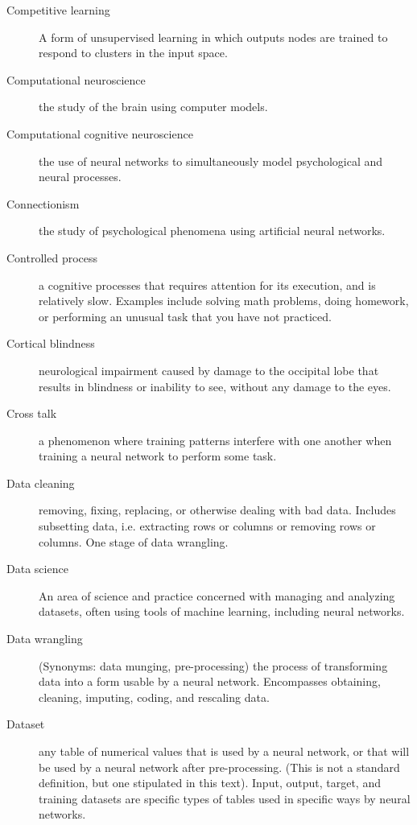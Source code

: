 \begin{description}
\item[Competitive learning] A form of unsupervised learning in which outputs nodes are trained to respond to clusters in the input space. 

\item[Computational neuroscience] the study of the brain using computer models.

\item[Computational cognitive neuroscience] the use of neural networks to simultaneously model psychological and neural processes.

\item[Connectionism] the study of psychological phenomena using artificial neural networks.

\item[Controlled process] a cognitive processes that requires attention for its execution, and is relatively slow. Examples include solving math problems, doing homework, or performing an  unusual task that you have not practiced.

\item[Cortical blindness] neurological impairment caused by damage to the occipital lobe that results in blindness or inability to see, without any damage to the eyes. 

\item[Cross talk] a phenomenon where training patterns interfere with one another when training a neural network to perform some task. 

\item[Data cleaning] removing, fixing, replacing, or otherwise dealing with bad data. Includes subsetting data, i.e. extracting rows or columns or removing rows or columns. One stage of data wrangling.

\item[Data science]  An area of science and practice concerned with managing and analyzing datasets, often using tools of machine learning, including neural networks.

\item[Data wrangling] (Synonyms: data munging, pre-processing) the process of transforming data into a form usable by a neural network. Encompasses obtaining, cleaning, imputing, coding, and rescaling data. 

\item[Dataset] any table of numerical values that is used by a neural network, or that will be used by a neural network after pre-processing. (This is not a standard definition, but one stipulated in this text). Input, output, target, and training datasets are specific types of tables used in specific ways by neural networks.


\end{description}
